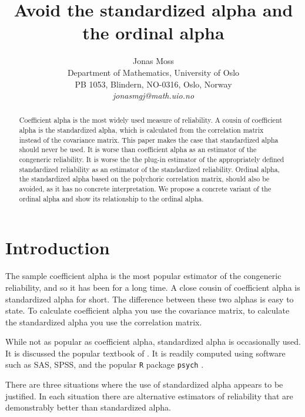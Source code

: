 \documentclass[twoside]{article}
\title{Avoid the standardized alpha and the ordinal alpha}
\author{
  Jonas Moss \orcid{0000-0002-6876-6964} \\
  Department of Mathematics, University of Oslo\\
  PB 1053, Blindern, NO-0316, Oslo, Norway \\
  \it{jonasmgj@math.uio.no}
}
\begin{document}
\maketitle

\begin{abstract}
Coefficient alpha is the most widely used measure of reliability. A cousin of coefficient alpha is the standardized alpha, which is calculated from the correlation matrix instead of the covariance matrix. This paper makes the case that standardized alpha should never be used. It is worse than coefficient alpha as an estimator of the congeneric reliability. It is worse the the plug-in estimator of the appropriately defined standardized reliability as an estimator of the standardized reliability. Ordinal alpha, the standardized alpha based on the polychoric correlation matrix, should also be avoided, as it has no concrete interpretation. We propose a concrete variant of the ordinal alpha and show its relationship to the ordinal alpha.
\end{abstract}



\section{Introduction}

The sample coefficient alpha is the most popular estimator of the congeneric reliability, and so it has been for a long time. A close cousin of coefficient alpha is standardized alpha for short. The difference between these two alphas is easy to state. To calculate coefficient alpha you use the covariance matrix, to calculate the standardized alpha you use the correlation matrix. 

While not as popular as coefficient alpha, standardized alpha is occasionally used. It is discussed the popular textbook of \citet[pp. 139--141]{Furr2013-yu}. It is readily computed using software such as SAS, SPSS, and the popular \texttt{R} \citep{Team2013-tt} package \texttt{psych} \citep{psych}. 

There are three situations where the use of standardized alpha appears to be justified. In each situation there are alternative estimators of reliability that are demonstrably better than standardized alpha. 
\end{document}
